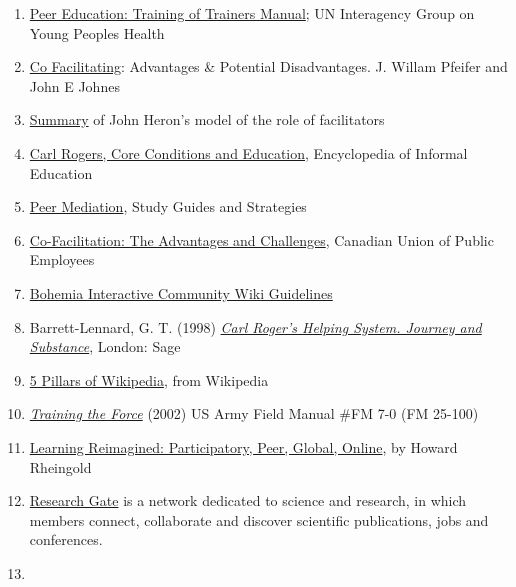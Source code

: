 \begin{enumerate}
\def\labelenumi{\arabic{enumi}.}
\item
  \href{http://www.scribd.com/doc/54544925/51/TRAINING-TOPIC-Co-facilitation-skills}{Peer
  Education: Training of Trainers Manual}; UN Interagency Group on Young
  Peoples Health
\item
  \href{http://www.breakoutofthebox.com/Co-FacilitatingPfeifferJones.pdf}{Co
  Facilitating}: Advantages \& Potential Disadvantages. J. Willam
  Pfeifer and John E Johnes
\item
  \href{http://reviewing.co.uk/archives/art/13_1_what_do_facilitators_do.htm\#8_WAYS_OF_FACILITATING_ACTIVE_LEARNING}{Summary}
  of John Heron's model of the role of facilitators
\item
  \href{http://www.infed.org/thinkers/et-rogers.htm}{Carl Rogers, Core
  Conditions and Education}, Encyclopedia of Informal Education
\item
  \href{http://www.studygs.net/peermed.htm}{Peer Mediation}, Study
  Guides and Strategies
\item
  \href{http://sk.cupe.ca/updir/cofacilitation-handouts.doc}{Co-Facilitation:
  The Advantages and Challenges}, Canadian Union of Public Employees
\item
  \href{http://community.bistudio.com/wiki/Bohemia_Interactive_Community:Guidelines}{Bohemia
  Interactive Community Wiki Guidelines}
\item
  Barrett-Lennard, G. T. (1998)
  \emph{\href{http://openlibrary.org/works/OL2014352W/Carl_Rogers'_Helping_System}{Carl
  Roger's Helping System. Journey and Substance}}, London: Sage
\item
  \href{http://en.wikipedia.org/w/index.php?title=Wikipedia:Five_pillars\&oldid=501472166}{5
  Pillars of Wikipedia}, from Wikipedia
\item
  \emph{\href{http://www.africom.mil/WO-NCO/DownloadCenter/\%5C40Publications/Training\%20the\%20Force\%20Manual.pdf}{Training
  the Force}} (2002) US Army Field Manual \#FM 7-0 (FM 25-100)
\item
  \href{http://dmlcentral.net/blog/howard-rheingold/learning-reimagined-participatory-peer-global-online}{Learning
  Reimagined: Participatory, Peer, Global, Online}, by Howard Rheingold
\item
  \href{http://www.researchgate.net/}{Research Gate} is a network
  dedicated to science and research, in which members connect,
  collaborate and discover scientific publications, jobs and
  conferences.
\item

\end{enumerate}
